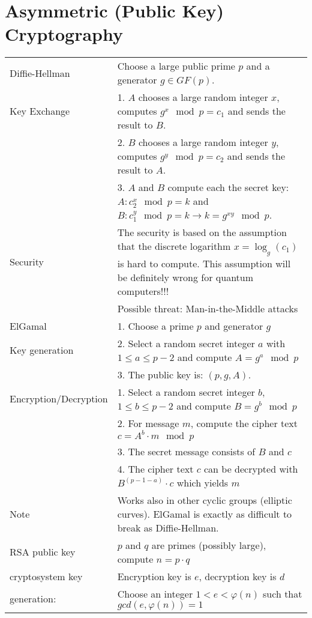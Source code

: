 \section{Asymmetric (Public Key) Cryptography}
\label{sec::CrypCod_Asymmetric Crypto}
\begin{tabular}{|l| p{14.7cm}|}
	\hline
	Diffie-Hellman				 	& 	Choose a large public prime $p$ and a generator $g \in GF(p)$.\\
	Key Exchange					&	1. $A$ chooses a large random integer $x$, computes $g^x \mod p = c_1$ and sends the result to $B$. \\
									&	2. $B$ chooses a large random integer $y$, computes $g^y \mod p = c_2$ and sends the result to $A$. \\
									&	3. $A$ and $B$ compute each the secret key: $A: c_2^x \mod p=k $ and $B: c_1^y \mod p=k \to k=g^{xy} \mod p$.\\
									\cline{2-2}
	Security        & 	The security is based on the assumption that the discrete logarithm $x=\log_{g}(c_1)$ is hard to compute. This assumption will be definitely wrong for quantum computers!!!\\
									& Possible threat: Man-in-the-Middle attacks\\
	\hline
	ElGamal 				& 1. Choose a prime $p$ and generator $g$\\
	Key generation  & 2. Select a random secret integer $a$ with $1 \leq a \leq p-2$ and compute $A=g^a \mod p$\\
	 								& 3. The public key is: $(p, g, A)$.\\
									\cline{2-2}
	Encryption/Decryption & 1. Select a random secret integer $b$, $1 \leq b \leq p-2$ and compute $B=g^b \mod p$\\
												& 2. For message $m$, compute the cipher text $c=A^b \cdot m \mod p$\\
												& 3. The secret message consists of $B$ and $c$\\
												& 4. The cipher text $c$ can be decrypted with $B^{(p-1-a)} \cdot c$ which yields $m$\\
									\cline{2-2}
	Note & Works also in other cyclic groups (elliptic curves). ElGamal is exactly as difficult to break as Diffie-Hellman.\\
	\hline
	RSA public key 					&	$p$ and $q$ are primes (possibly large), compute $n=p\cdot q$\\
	cryptosystem key				& Encryption key is $e$, decryption key is $d$\\
	generation:						&	Choose an integer $1<e<\varphi(n)$ such that $gcd(e,\varphi(n))=1$\\

\end{tabular}
